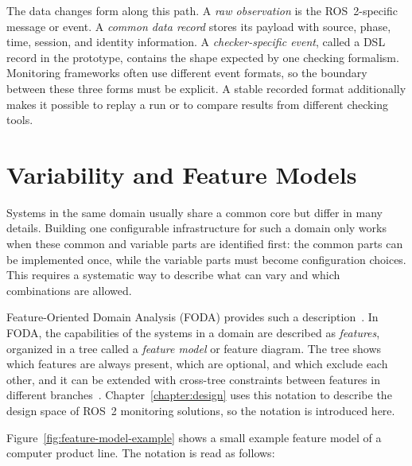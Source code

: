 The data changes form along this path. A \emph{raw observation} is the
ROS~2-specific message or event. A \emph{common data record} stores its payload
with source, phase, time, session, and identity information. A
\emph{checker-specific event}, called a DSL record in the prototype, contains
the shape expected by one checking formalism. Monitoring frameworks often use
different event formats, so the boundary between these three forms must be
explicit. A stable recorded format additionally makes it possible to replay a
run or to compare results from different checking tools.

\section{Variability and Feature Models}\label{sec:feature-models}

Systems in the same domain usually share a common core but differ in many
details. Building one configurable infrastructure for such a domain only works
when these common and variable parts are identified first: the common parts
can be implemented once, while the variable parts must become configuration
choices. This requires a systematic way to describe what can vary and which
combinations are allowed.

Feature-Oriented Domain Analysis (FODA) provides such a
description~\cite{kang1990foda}. In FODA, the capabilities of the systems in a
domain are described as \emph{features}, organized in a tree called a
\emph{feature model} or feature diagram. The tree shows which features are
always present, which are optional, and which exclude each other, and it can
be extended with cross-tree constraints between features in different
branches~\cite{benavides2010automated}.
Chapter~\ref{chapter:design} uses this notation to describe the design space
of ROS~2 monitoring solutions, so the notation is introduced here.

Figure~\ref{fig:feature-model-example} shows a small example feature model of
a computer product line. The notation is read as follows:

